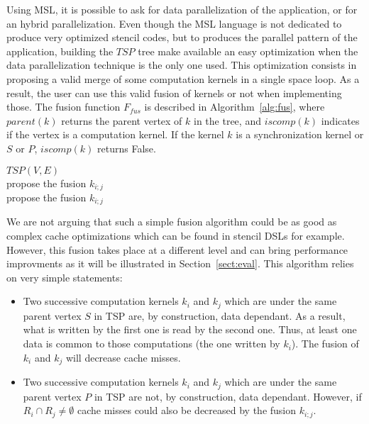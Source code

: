 Using MSL, it is possible to ask for data parallelization of the application, or for an hybrid parallelization. Even though the MSL language is not dedicated to produce very optimized stencil codes, but to produces the parallel pattern of the application, building the $TSP$ tree make available an easy optimization when the data parallelization technique is the only one used. This optimization consists in proposing a valid merge of some computation kernels in a single space loop. As a result, the user can use this valid fusion of kernels or not when implementing those. The fusion function $F_{fus}$ is described in Algorithm~\ref{alg:fus}, where $parent(k)$ returns the parent vertex of $k$ in the tree, and $iscomp(k)$ indicates if the vertex is a computation kernel. If the kernel $k$ is a synchronization kernel or $S$ or $P$, $iscomp(k)$ returns False.

\begin{algorithm}
\caption{$F_{fus}$}
\label{alg:fus}
\begin{algorithmic}[1]
 {$TSP(V,E)$}
\\propose the fusion $k_{i;j}$
\EndIf
\EndIf
{}
\\propose the fusion $k_{i;j}$
\EndIf
\EndIf
\EndIf
\EndIf
\EndFor
\EndProcedure
\end{algorithmic}
\end{algorithm}

We are not arguing that such a simple fusion algorithm could be as good as complex cache optimizations which can be found in stencil DSLs for example. However, this fusion takes place at a different level and can bring performance improvments as it will be illustrated in Section~\ref{sect:eval}. This algorithm relies on very simple statements:
\begin{itemize}
\item Two successive computation kernels $k_i$ and $k_j$ which are under the same parent vertex $S$ in TSP are, by construction, data dependant. As a result, what is written by the first one is read by the second one. Thus, at least one data is common to those computations (the one written by $k_i$). The fusion of $k_i$ and $k_j$ will decrease cache misses.
\item Two successive computation kernels $k_i$ and $k_j$ which are under the same parent vertex $P$ in TSP are not, by construction, data dependant. However, if $R_i \cap R_j \neq \emptyset$ cache misses could also be decreased by the fusion $k_{i;j}$.
\end{itemize}

